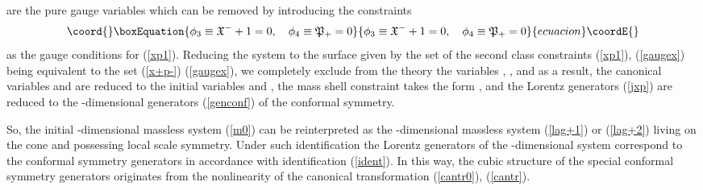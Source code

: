 \documentclass[a4paper,12pt]{article}
\def\X{\mathfrak X}
\def\P{\mathfrak P}
\begin{document}
\myHighlight{$\tilde\P_+=\P_+$}\coordHE{}
are the pure gauge variables which
can be removed by introducing
the constraints
\begin{equation}\coord{}\boxEquation{
\phi_3\equiv\X^-+1=0,\quad
\phi_4\equiv\P_+=0
\label{gaugex}
}{
\phi_3\equiv\X^-+1=0,\quad
\phi_4\equiv\P_+=0
}{ecuacion}\coordE{}\end{equation}
as the gauge conditions for (\ref{xp1}).
Reducing the system to the surface given by
the set of the second class constraints (\ref{xp1}),
(\ref{gaugex})
 being equivalent to the set (\ref{x+p-})
(\ref{gaugex}),
we completely exclude from the theory
the variables \myHighlight{$\X^\pm$}\coordHE{}, \myHighlight{$\P_\pm$}\coordHE{},
and
as a result,
the canonical variables \myHighlight{$\tilde\X^\mu$}\coordHE{} and \myHighlight{$\tilde\P_\mu$}\coordHE{}
are reduced to the initial variables
\myHighlight{$\X^\mu$}\coordHE{} and \myHighlight{$\P_\mu$}\coordHE{},
the mass shell constraint takes
the form \myHighlight{$\phi_0=\P_\mu\P^\mu=0$}\coordHE{},
and the Lorentz generators (\ref{jxp})
are reduced to the \coordHE{}-dimensional generators
(\ref{genconf}) of the conformal symmetry.


So, the
initial \coordHE{}-dimensional massless system (\ref{m0})
can be reinterpreted as the
\coordHE{}-dimensional massless system
(\ref{lag+1}) or (\ref{lag+2}) living on the cone
and possessing
local scale symmetry.
Under such identification
the \coordHE{} Lorentz generators
of the \coordHE{}-dimensional system
correspond to the conformal symmetry
generators in accordance with identification
(\ref{ident}).
In this way, the cubic structure of the
special conformal symmetry generators
\coordHE{} originates from the nonlinearity
of the canonical transformation (\ref{cantr0}),
(\ref{cantr}).
\end{document}
